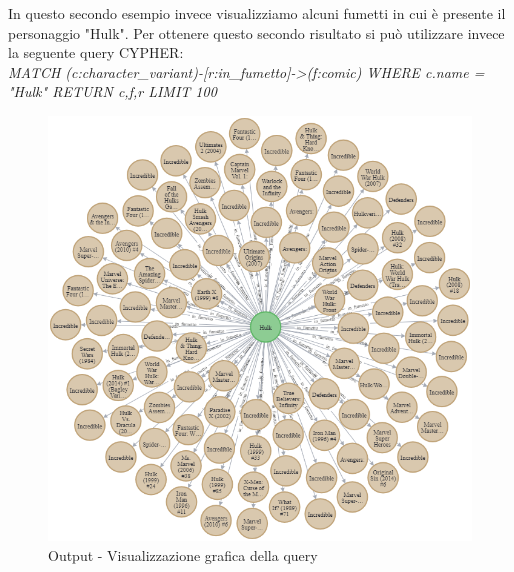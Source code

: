 \documentclass[
12pt, %
a4paper, %
oneside, %
headinclude,footinclude, %
BCOR5mm, %
]{scrartcl}
\begin{document}
In questo secondo esempio invece visualizziamo alcuni fumetti in cui è presente il personaggio "Hulk".
Per ottenere questo secondo risultato si può utilizzare invece la seguente query CYPHER: \\\newline \textit{MATCH (c:character\_variant)-[r:in\_fumetto]->(f:comic) WHERE c.name = "Hulk" RETURN c,f,r LIMIT 100}
\begin{figure}[H]
  \includegraphics[scale=0.5]{./Figures/query_2.png}
  \caption{Output - Visualizzazione grafica della query}
\end{figure}

\end{document}
